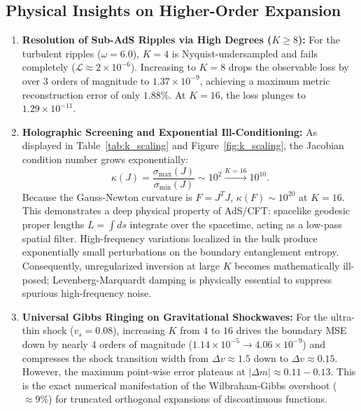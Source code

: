 \documentclass[11pt,a4paper]{article}
\begin{document}
\subsection{Physical Insights on Higher-Order Expansion}
\begin{enumerate}
    \item \textbf{Resolution of Sub-AdS Ripples via High Degrees ($K \ge 8$):}
    For the turbulent ripples ($\omega = 6.0$), $K = 4$ is Nyquist-undersampled and fails completely ($\mathcal{L} \approx 2 \times 10^{-6}$). Increasing to $K = 8$ drops the observable loss by over 3 orders of magnitude to $1.37 \times 10^{-9}$, achieving a maximum metric reconstruction error of only \textbf{$1.88\%$}. At $K = 16$, the loss plunges to $1.29 \times 10^{-11}$.
    
    \item \textbf{Holographic Screening and Exponential Ill-Conditioning:}
    As displayed in Table~\ref{tab:k_scaling} and Figure~\ref{fig:k_scaling}, the Jacobian condition number grows exponentially:
    \begin{equation}
        \kappa(J) = \frac{\sigma_{\max}(J)}{\sigma_{\min}(J)} \sim 10^2 \xrightarrow{K=16} 10^{10}.
    \end{equation}
    Because the Gauss-Newton curvature is $F = J^T J$, $\kappa(F) \sim 10^{20}$ at $K = 16$. This demonstrates a deep physical property of AdS/CFT: spacelike geodesic proper lengths $L = \int ds$ integrate over the spacetime, acting as a low-pass spatial filter. High-frequency variations localized in the bulk produce exponentially small perturbations on the boundary entanglement entropy. Consequently, unregularized inversion at large $K$ becomes mathematically ill-posed; Levenberg-Marquardt damping is physically essential to suppress spurious high-frequency noise.
    
    \item \textbf{Universal Gibbs Ringing on Gravitational Shockwaves:}
    For the ultra-thin shock ($v_s = 0.08$), increasing $K$ from $4$ to $16$ drives the boundary MSE down by nearly 4 orders of magnitude ($1.14 \times 10^{-5} \to 4.06 \times 10^{-9}$) and compresses the shock transition width from $\Delta v \approx 1.5$ down to $\Delta v \approx 0.15$. However, the maximum point-wise error plateaus at $|\Delta m| \approx 0.11 - 0.13$. This is the exact numerical manifestation of the Wilbraham-Gibbs overshoot ($\approx 9\%$) for truncated orthogonal expansions of discontinuous functions.
\end{enumerate}
\end{document}

